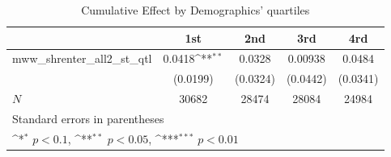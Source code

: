 \begin{table}[htbp]\centering
\def\sym#1{\ifmmode^{#1}\else\(^{#1}\)\fi}
\caption{Cumulative Effect by Demographics' quartiles}
\begin{tabular}{l*{4}{c}}
\hline\hline
            &\multicolumn{1}{c}{1st}&\multicolumn{1}{c}{2nd}&\multicolumn{1}{c}{3rd}&\multicolumn{1}{c}{4rd}\\
\hline
mww\_shrenter\_all2\_st\_qtl&      0.0418\sym{**} &      0.0328         &     0.00938         &      0.0484         \\
            &    (0.0199)         &    (0.0324)         &    (0.0442)         &    (0.0341)         \\
\hline
\(N\)       &       30682         &       28474         &       28084         &       24984         \\
\hline\hline
\multicolumn{5}{l}{\footnotesize Standard errors in parentheses}\\
\multicolumn{5}{l}{\footnotesize \sym{*} \(p<0.1\), \sym{**} \(p<0.05\), \sym{***} \(p<0.01\)}\\
\end{tabular}
\end{table}
